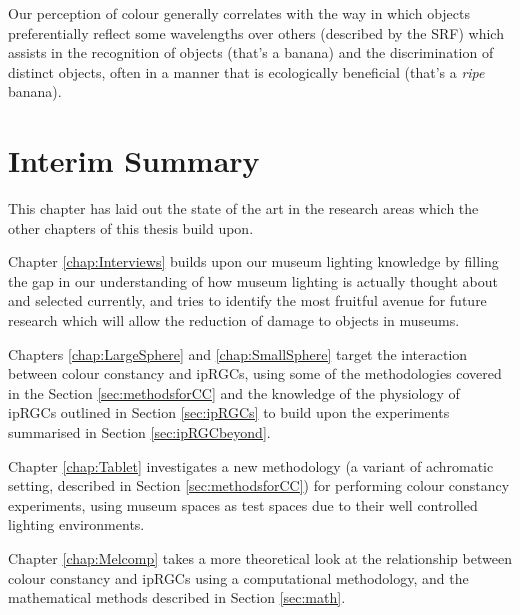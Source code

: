 Our perception of colour generally correlates with the way in which objects preferentially reflect some wavelengths over others (described by the \acrfull{SRF}) which assists in the recognition of objects (that's a banana) and the discrimination of distinct objects, often in a manner that is ecologically beneficial (that's a \emph{ripe} banana).

\newpage












\section{Interim Summary}

This chapter has laid out the state of the art in the research areas which the other chapters of this thesis build upon. 

Chapter \ref{chap:Interviews} builds upon our museum lighting knowledge by filling the gap in our understanding of how museum lighting is actually thought about and selected currently, and tries to identify the most fruitful avenue for future research which will allow the reduction of damage to objects in museums.

Chapters \ref{chap:LargeSphere} and \ref{chap:SmallSphere} target the interaction between colour constancy and \glspl{ipRGC}, using some of the methodologies covered in the Section \ref{sec:methodsforCC} and the knowledge of the physiology of \glspl{ipRGC} outlined in Section \ref{sec:ipRGCs} to build upon the experiments summarised in Section \ref{sec:ipRGCbeyond}.

Chapter \ref{chap:Tablet} investigates a new methodology (a variant of achromatic setting, described in Section \ref{sec:methodsforCC}) for performing colour constancy experiments, using museum spaces as test spaces due to their well controlled lighting environments.

Chapter \ref{chap:Melcomp} takes a more theoretical look at the relationship between colour constancy and \glspl{ipRGC} using a computational methodology, and the mathematical methods described in Section \ref{sec:math}.
